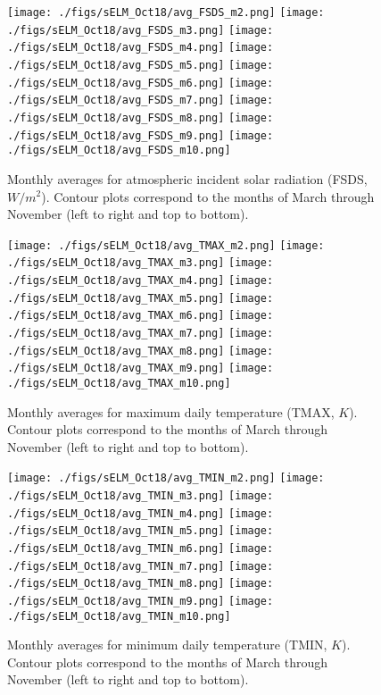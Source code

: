 \documentclass[10pt]{article}
\begin{document}
\begin{figure}[htb!]
\centering
\texttt{[image: ./figs/sELM\_Oct18/avg\_FSDS\_m2.png]}
\texttt{[image: ./figs/sELM\_Oct18/avg\_FSDS\_m3.png]}
\texttt{[image: ./figs/sELM\_Oct18/avg\_FSDS\_m4.png]}
\texttt{[image: ./figs/sELM\_Oct18/avg\_FSDS\_m5.png]}
\texttt{[image: ./figs/sELM\_Oct18/avg\_FSDS\_m6.png]}
\texttt{[image: ./figs/sELM\_Oct18/avg\_FSDS\_m7.png]}
\texttt{[image: ./figs/sELM\_Oct18/avg\_FSDS\_m8.png]}
\texttt{[image: ./figs/sELM\_Oct18/avg\_FSDS\_m9.png]}
\texttt{[image: ./figs/sELM\_Oct18/avg\_FSDS\_m10.png]}
\caption{Monthly averages for atmospheric incident solar radiation (FSDS, $W/m^2$). Contour plots correspond 
to the months of March through November (left to right and top to bottom).\label{fig:fsdsavg}}
\end{figure}

\begin{figure}[htb!]
\centering
\texttt{[image: ./figs/sELM\_Oct18/avg\_TMAX\_m2.png]}
\texttt{[image: ./figs/sELM\_Oct18/avg\_TMAX\_m3.png]}
\texttt{[image: ./figs/sELM\_Oct18/avg\_TMAX\_m4.png]}
\texttt{[image: ./figs/sELM\_Oct18/avg\_TMAX\_m5.png]}
\texttt{[image: ./figs/sELM\_Oct18/avg\_TMAX\_m6.png]}
\texttt{[image: ./figs/sELM\_Oct18/avg\_TMAX\_m7.png]}
\texttt{[image: ./figs/sELM\_Oct18/avg\_TMAX\_m8.png]}
\texttt{[image: ./figs/sELM\_Oct18/avg\_TMAX\_m9.png]}
\texttt{[image: ./figs/sELM\_Oct18/avg\_TMAX\_m10.png]}
\caption{Monthly averages for maximum daily temperature (TMAX, $K$). Contour plots correspond 
to the months of March through November (left to right and top to bottom).\label{fig:tmaxavg}}
\end{figure}

\begin{figure}[htb!]
\centering
\texttt{[image: ./figs/sELM\_Oct18/avg\_TMIN\_m2.png]}
\texttt{[image: ./figs/sELM\_Oct18/avg\_TMIN\_m3.png]}
\texttt{[image: ./figs/sELM\_Oct18/avg\_TMIN\_m4.png]}
\texttt{[image: ./figs/sELM\_Oct18/avg\_TMIN\_m5.png]}
\texttt{[image: ./figs/sELM\_Oct18/avg\_TMIN\_m6.png]}
\texttt{[image: ./figs/sELM\_Oct18/avg\_TMIN\_m7.png]}
\texttt{[image: ./figs/sELM\_Oct18/avg\_TMIN\_m8.png]}
\texttt{[image: ./figs/sELM\_Oct18/avg\_TMIN\_m9.png]}
\texttt{[image: ./figs/sELM\_Oct18/avg\_TMIN\_m10.png]}
\caption{Monthly averages for minimum daily temperature (TMIN, $K$). Contour plots correspond 
to the months of March through November (left to right and top to bottom).\label{fig:tminavg}}
\end{figure}
\end{document}
